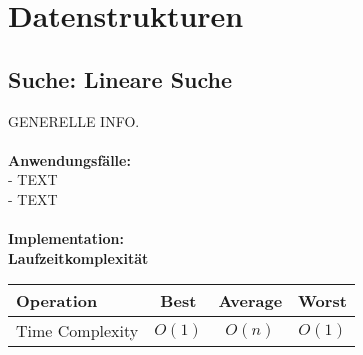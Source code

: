 \documentclass[../main.tex]{subfiles}
\begin{document}
	
	\section{Datenstrukturen}

	\subsection{Suche: Lineare Suche}
	GENERELLE INFO. \\\\
	\textbf{Anwendungsfälle:}\\
		- TEXT\\
		- TEXT\\\\
	\textbf{Implementation:}\\
	 
	\textbf{Laufzeitkomplexität}\\
	\begin{table}[ht]
		\centering
		\begin{tabular}{l *{3}{c}}
			\toprule
			Operation & Best & Average & Worst\\
			\midrule
			Time Complexity & $O(1)$ & $O(n)$ & $O(1)$\\
			\bottomrule
		\end{tabular}
	\end{table}
	\clearpage
	
\end{document}

